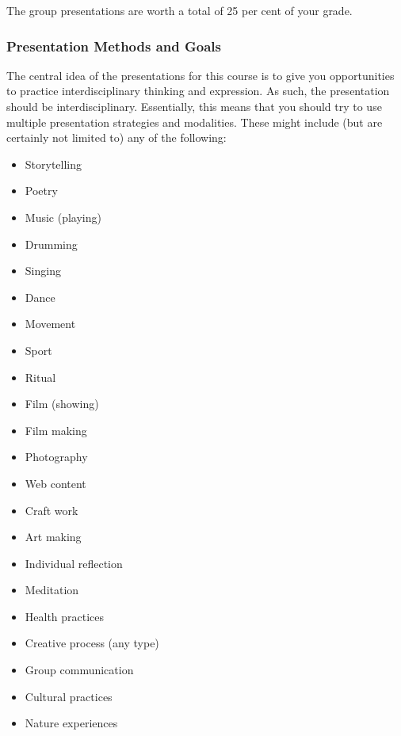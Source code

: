 \documentclass{report}
\begin{document}
The group presentations are worth a total of 25 per cent of your grade.

\subsubsection{Presentation Methods and Goals}

The central idea of the presentations for this course is to give you
 opportunities to practice interdisciplinary thinking and expression.
 As such, the presentation should be interdisciplinary. Essentially,
 this means that you should try to use multiple presentation
 strategies and modalities. These might include (but are certainly not
 limited to) any of the following:

 \begin{itemize}
 \item Storytelling
 \item Poetry
 \item Music (playing)
 \item Drumming
 \item Singing
 \item Dance
 \item Movement
 \item Sport
 \item Ritual
 \item Film (showing)
 \item Film making
 \item Photography
 \item Web content
 \item Craft work
 \item Art making
 \item Individual reflection
 \item Meditation
 \item Health practices
 \item Creative process (any type)
 \item Group communication
 \item Cultural practices
 \item Nature experiences
 \end{itemize}
\end{document}

